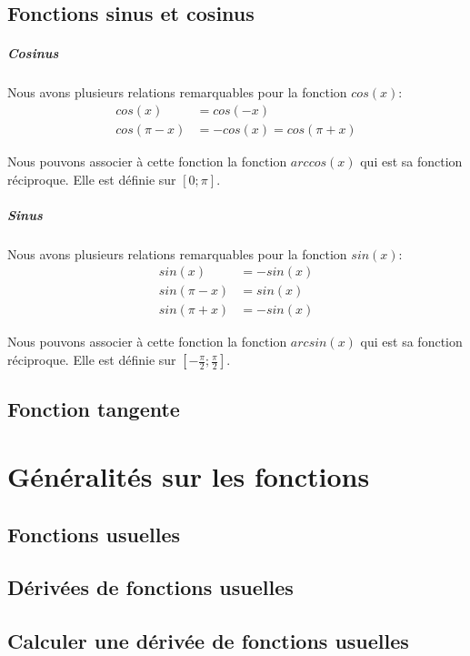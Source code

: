 \documentclass[12pt,a4paper,openany]{book}
\begin{document}
\section{Fonctions sinus et cosinus}

\paragraph{Cosinus} Nous avons plusieurs relations remarquables pour la fonction $ cos(x) $:
\begin{align}
cos(x) & = cos(-x)\\
cos(\pi - x) & = -cos(x) = cos(\pi + x)
\end{align}

Nous pouvons associer à cette fonction la fonction $ arccos(x) $ qui est sa fonction réciproque. Elle est définie sur $ [0; \pi] $.

\paragraph{Sinus} Nous avons plusieurs relations remarquables pour la fonction $ sin(x) $:
\begin{align}
sin(x) & = -sin(x)\\
sin(\pi - x) & = sin(x)\\
sin(\pi + x) & = -sin(x)
\end{align}

Nous pouvons associer à cette fonction la fonction $ arcsin(x) $ qui est sa fonction réciproque. Elle est définie sur $ [-\frac{\pi}{2}; \frac{\pi}{2}] $.

\section{Fonction tangente}

\chapter{Généralités sur les fonctions}

\section{Fonctions usuelles}

\section{Dérivées de fonctions usuelles}

\section{Calculer une dérivée de fonctions usuelles}
\end{document}
